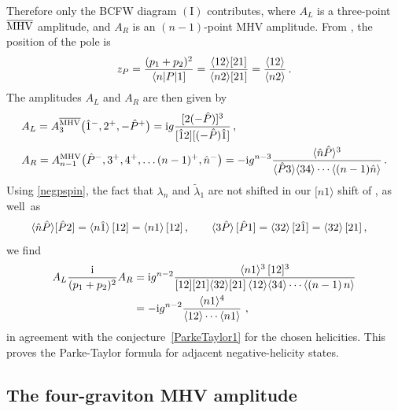 Therefore only the BCFW diagram $(\text{I})$ contributes, where $A_L$ is a three-point $\overline{\rm MHV}$ amplitude, and $A_R$ is an $(n-1)$-point MHV amplitude. 
From , the position of the pole is 
\begin{align}
z_{P} = \frac{ (p_1 + p_2 )^2 }{ \langle n | P|1 \rbrack} = \frac{ \langle12\rangle\lbrack2 1 \rbrack}{\langle n 2\rangle \lbrack2 1\rbrack} = \frac{\langle12\rangle}{\langle n 2\rangle} \, .
\end{align}
The amplitudes $A_{L}$ and $A_{R}$ are then given by
\begin{align} \begin{aligned}
& A_{L} = A^{\overline{\text{MHV}}}_{3}\bigl( \hat{1}^{-},2^{+},-\hat{P}^{+} \bigr) =  \mathrm{i} g  
\frac{ \lbrack 2 (-
\hat{P}) \rbrack^3}{\lbrack \hat{1}2 \rbrack \lbrack (-\hat{P}) \hat{1} \rbrack} \,, \\
& A_{R} = A^{\text{MHV}}_{n-1}\bigl(\hat{P}^- , 3^+ , 4^+, \ldots (n-1)^{+} , \hat{n}^{-}\bigr) =   -\mathrm{i} g^{n-3}  \frac{ \langle\hat{n} \hat{P}\rangle^3 }{\langle\hat{P} 3\rangle \langle34\rangle \cdots \langle(n-1) \hat{n}\rangle}\,.
\end{aligned} \end{align}
Using \eqref{negpspin}, the fact that $\lambda_n$ and $\tilde{\lambda}_1$ are not shifted in  our $[n1\rangle$ shift of , as well~as 
%
\begin{align}
\langle\hat{n} \hat{P}\rangle [\hat P 2] &= \langle n\hat 1\rangle\, [12] = \langle n1\rangle\, [12]\, , \qquad
\langle3\hat P\rangle  \,[\hat P 1] 
= \langle32\rangle\, [2\hat 1] = \langle32\rangle\, [21]\, , 
\end{align}
%
we find
\begin{align} \begin{aligned}
A_{L}  \frac{\mathrm{i}}{(p_1 + p_2)^2} A_{R} &=
\mathrm{i} g^{n-2}\frac{\langle n1\rangle^{3}
\, [12]^{3}}{[12][21]\langle32\rangle[21]\, \langle12\rangle\langle34\rangle\cdots
\langle(n-1)\, n\rangle} \\
&
=- \mathrm{i} g^{n-2} \frac{ \langle n 1\rangle^4}{\langle12\rangle \cdots \langle n1\rangle} \ , 
\end{aligned} \end{align}
in agreement with the conjecture~\eqref{ParkeTaylor1} for the chosen helicities. This proves
the Parke-Taylor formula for adjacent negative-helicity states.


\subsection{The four-graviton MHV amplitude}

